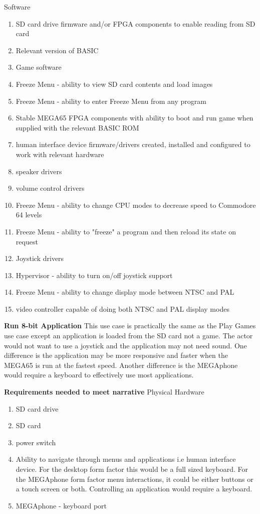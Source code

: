 Software
\begin{enumerate}
\item SD card drive firmware and/or FPGA components to enable reading from SD card
\item Relevant version of BASIC 
\item Game software
\item Freeze Menu - ability to view SD card contents and load images
\item Freeze Menu - ability to enter Freeze Menu from any program
\item Stable MEGA65 FPGA components with ability to boot and run game when supplied with the relevant BASIC ROM
\item human interface device firmware/drivers created, installed and configured to work with relevant hardware
\item speaker drivers
\item volume control drivers 
\item Freeze Menu - ability to change CPU modes to decrease speed to Commodore 64 levels
\item Freeze Menu - ability to "freeze" a program and then reload its state on request
\item Joystick drivers
\item Hypervisor - ability to turn on/off joystick support
\item Freeze Menu - ability to change display mode between NTSC and PAL
\item video controller capable of doing both NTSC and PAL display modes
\end{enumerate}

\textbf{Run 8-bit Application}
This use case is practically the same as the Play Games use case except an application is loaded from the SD card not a game. The actor would not want to use a joystick and the application may not need sound. One difference is the application may be more responsive and faster when the MEGA65 is run at the fastest speed. Another difference is the MEGAphone would require a keyboard to effectively use most applications.

\textbf{Requirements needed to meet narrative}
Physical Hardware
\begin{enumerate}
\item SD card drive
\item SD card
\item power switch
\item Ability to navigate through menus and applications i.e human interface device. For the desktop form factor this would be a full sized keyboard. For the MEGAphone form factor menu interactions, it could be either buttons or a touch screen or both. Controlling an application would require a keyboard.
\item MEGAphone - keyboard port
\end{enumerate}

